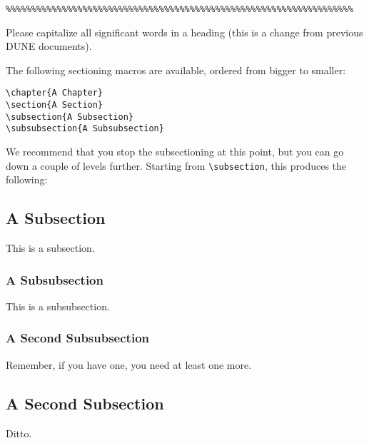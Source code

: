 \begin{verbatim}
%%%%%%%%%%%%%%%%%%%%%%%%%%%%%%%%%%%%%%%%%%%%%%%%%%%%%%%%%%%%%%%%%%%%
\end{verbatim}

Please capitalize all significant words in a heading (this is a change from 
previous DUNE documents).

The following sectioning macros are available, ordered from bigger to smaller:

\begin{verbatim}
\chapter{A Chapter}
\section{A Section}
\subsection{A Subsection}
\subsubsection{A Subsubsection}
\end{verbatim}

We recommend that you stop the subsectioning at this point, but you can go down a couple of levels further.
Starting from \verb|\subsection|, this produces the following:

\subsection{A Subsection}
\label{sec:latex-sec-sub}

This is a subsection.

\subsubsection{A Subsubsection}
\label{sec:latex-sec-subsub}

This is a subsubsection.

\subsubsection{A Second Subsubsection}
\label{sec:latex-sec-subsub2}

Remember, if you have one, you need at least one more.

\subsection{A Second Subsection}
\label{sec:latex-sub2}

Ditto.
